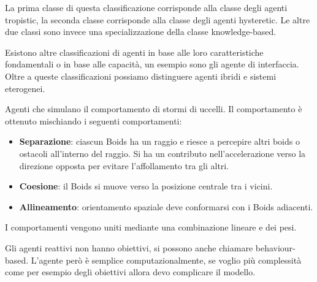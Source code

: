 La prima classe di questa classificazione corrisponde alla classe degli agenti
tropistic, la seconda classe corrisponde alla classe degli agenti hysteretic. Le
altre due classi sono invece una specializzazione della classe knowledge-based.

Esistono altre classificazioni di agenti in base alle loro caratteristiche
fondamentali o in base alle capacità, un esempio sono gli agente di interfaccia.
Oltre a queste classificazioni possiamo distinguere agenti ibridi e sistemi
eterogenei.
\begin{esempio}
    Agenti che simulano il comportamento di stormi di uccelli. Il comportamento
    è ottenuto mischiando i seguenti comportamenti:
    \begin{itemize}
        \item \textbf{Separazione}: ciascun Boids ha un raggio e riesce a percepire
              altri boids o ostacoli all'interno del raggio. Si ha un contributo
              nell'accelerazione verso la direzione opposta per evitare
              l'affollamento tra gli altri.
        \item \textbf{Coesione}: il Boids si muove verso la posizione centrale
              tra i vicini.
        \item \textbf{Allineamento}: orientamento spaziale deve conformarsi con
              i Boids adiacenti.
    \end{itemize}
    I comportamenti vengono uniti mediante una combinazione lineare e dei pesi.
\end{esempio}
Gli agenti reattivi non hanno obiettivi, si possono anche chiamare behaviour-based.
L'agente però è semplice computazionalmente, se voglio più complessità come per
esempio degli obiettivi allora devo complicare il modello.

